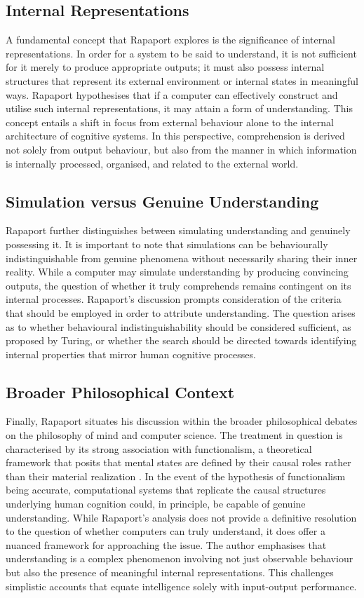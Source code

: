 \documentclass[runningheads]{llncs}
\begin{document}
\subsection{Internal Representations}
%
A fundamental concept that Rapaport explores is the significance of internal representations. In order for a system to be said to understand, it is not sufficient for it merely to produce appropriate outputs; it must also possess internal structures that represent its external environment or internal states in meaningful ways. Rapaport hypothesises that if a computer can effectively construct and utilise such internal representations, it may attain a form of understanding.
This concept entails a shift in focus from external behaviour alone to the internal architecture of cognitive systems. In this perspective, comprehension is derived not solely from output behaviour, but also from the manner in which information is internally processed, organised, and related to the external world.
%
%
\subsection{Simulation versus Genuine Understanding}
%
Rapaport further distinguishes between simulating understanding and genuinely possessing it. It is important to note that simulations can be behaviourally indistinguishable from genuine phenomena without necessarily sharing their inner reality. While a computer may simulate understanding by producing convincing outputs, the question of whether it truly comprehends remains contingent on its internal processes.
Rapaport's discussion prompts consideration of the criteria that should be employed in order to attribute understanding. The question arises as to whether behavioural indistinguishability should be considered sufficient, as proposed by Turing, or whether the search should be directed towards identifying internal properties that mirror human cognitive processes.
%
%
\subsection{Broader Philosophical Context}
%
Finally, Rapaport situates his discussion within the broader philosophical debates on the philosophy of mind and computer science. The treatment in question is characterised by its strong association with functionalism, a theoretical framework that posits that mental states are defined by their causal roles rather than their material realization \cite{putnam1967psychological}. In the event of the hypothesis of functionalism being accurate, computational systems that replicate the causal structures underlying human cognition could, in principle, be capable of genuine understanding.
While Rapaport's analysis does not provide a definitive resolution to the question of whether computers can truly understand, it does offer a nuanced framework for approaching the issue. The author emphasises that understanding is a complex phenomenon involving not just observable behaviour but also the presence of meaningful internal representations. This challenges simplistic accounts that equate intelligence solely with input-output performance.
%
%
%
%
\end{document}
